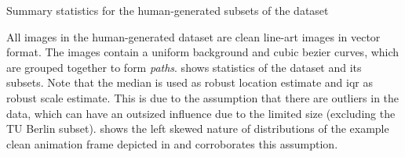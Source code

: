 \begin{table}[]
    \centering
    \caption{Summary statistics for the human-generated subsets of the dataset}
    \label{tab:dataset.statistics}
\end{table}

All images in the human-generated dataset are clean line-art images in vector format. The images contain a uniform background and cubic bezier curves, which are grouped together to form \textit{paths}.  shows statistics of the dataset and its subsets. Note that the median is used as robust location estimate and \gls{iqr} as robust scale estimate. This is due to the assumption that there are outliers in the data, which can have an outsized influence due to the limited size (excluding the TU Berlin subset).  shows the left skewed nature of distributions of the example clean animation frame depicted in  and corroborates this assumption.

